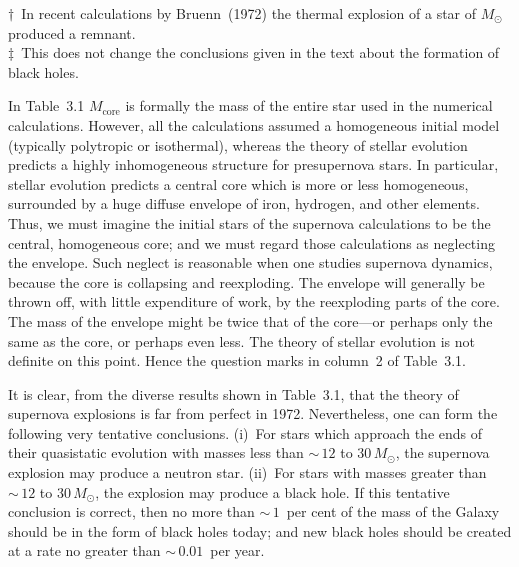 \begin{table}[htbp]
\medskip
\begin{flushleft}
\footnotesize
$\dagger$~In recent calculations by Bruenn~(1972)\cite{Bruenn1972} the thermal
explosion of a star of $M_\odot$ produced a remnant.\\[2pt]
$\ddagger$~This does not change the conclusions given in the text about the
formation of black holes.
\end{flushleft}
\end{table}


In Table~3.1 $M_{\text{core}}$ is formally the mass of the entire star used in the
numerical calculations.  However, all the calculations assumed a homogeneous
initial model (typically polytropic or isothermal), whereas the theory of stellar
evolution predicts a highly inhomogeneous structure for presupernova stars.  In
particular, stellar evolution predicts a central core which is more or less
homogeneous, surrounded by a huge diffuse envelope of iron, hydrogen, and other
elements.  Thus, we must imagine the initial stars of the supernova calculations to
be the central, homogeneous core; and we must regard those calculations as
neglecting the envelope.  Such neglect is reasonable when one studies supernova
dynamics, because the core is collapsing and reexploding.  The envelope will
generally be thrown off, with little expenditure of work, by the reexploding parts
of the core.  The mass of the envelope might be twice that of the core---or
perhaps only the same as the core, or perhaps even less.  The theory of stellar
evolution is not definite on this point.  Hence the question marks in column~2 of
Table~3.1.

It is clear, from the diverse results shown in Table~3.1, that the theory of
supernova explosions is far from perfect in 1972.  Nevertheless, one can form the
following very tentative conclusions.  (i)~For stars which approach the ends of
their quasistatic evolution with masses less than ${\sim}\,12$ to $30\,M_\odot$, the
supernova explosion may produce a neutron star.  (ii)~For stars with masses
greater than ${\sim}\,12$ to $30\,M_\odot$, the explosion may produce a black hole.  If
this tentative conclusion is correct, then no more than ${\sim}\,1$~per cent of the
mass of the Galaxy should be in the form of black holes today; and new black
holes should be created at a rate no greater than ${\sim}\,0.01$~per year.
